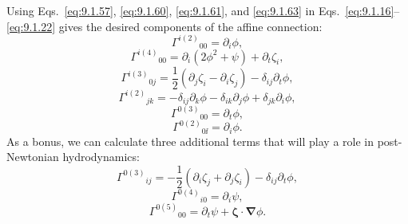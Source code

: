 Using Eqs.~\eqref{eq:9.1.57}, \eqref{eq:9.1.60},
\eqref{eq:9.1.61}, and \eqref{eq:9.1.63} in
Eqs.~\eqref{eq:9.1.16}--\eqref{eq:9.1.22} gives the desired components
of the affine connection:
\begin{equation}
  \Gamma^{i(2)}{}_{00}=\partial_i\phi,
  \tag{9.1.67}\label{eq:9.1.67}
\end{equation}
\begin{equation}
  \Gamma^{i(4)}{}_{00}
  =
  \partial_i(2\phi^2+\psi)+\partial_t\zeta_i,
  \tag{9.1.68}\label{eq:9.1.68}
\end{equation}
\begin{equation}
  \Gamma^{i(3)}{}_{0j}
  =
  \frac12(\partial_j\zeta_i-\partial_i\zeta_j)
  -\delta_{ij}\partial_t\phi,
  \tag{9.1.69}\label{eq:9.1.69}
\end{equation}
\begin{equation}
  \Gamma^{i(2)}{}_{jk}
  =
  -\delta_{ij}\partial_k\phi
  -\delta_{ik}\partial_j\phi
  +\delta_{jk}\partial_i\phi,
  \tag{9.1.70}\label{eq:9.1.70}
\end{equation}
\begin{equation}
  \Gamma^{0(3)}{}_{00}=\partial_t\phi,
  \tag{9.1.71}\label{eq:9.1.71}
\end{equation}
\begin{equation}
  \Gamma^{0(2)}{}_{0\ii}=\partial_i\phi.
  \tag{9.1.72}\label{eq:9.1.72}
\end{equation}
As a bonus, we can calculate three additional terms that will play a role
in post-Newtonian hydrodynamics:
\begin{equation}
  \Gamma^{0(3)}{}_{ij}
  =
  -\frac12(\partial_i\zeta_j+\partial_j\zeta_i)
  -\delta_{ij}\partial_t\phi,
  \tag{9.1.73}\label{eq:9.1.73}
\end{equation}
\begin{equation}
  \Gamma^{0(4)}{}_{i0}=\partial_i\psi,
  \tag{9.1.74}\label{eq:9.1.74}
\end{equation}
\begin{equation}
  \Gamma^{0(5)}{}_{00}
  =
  \partial_t\psi+\boldsymbol\zeta\cdot\boldsymbol\nabla\phi.
  \tag{9.1.75}\label{eq:9.1.75}
\end{equation}
